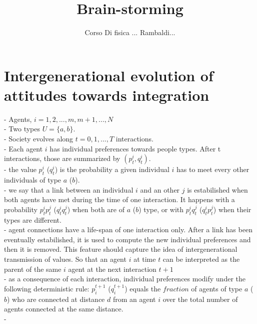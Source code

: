 \documentclass[12pt,titlepage]{article}
\title{Brain-storming}
\author{Corso Di fisica ... Rambaldi... }
\newcommand{\Andr}[1]{\textcolor{blue}{#1}}
\begin{document}


\section*{Intergenerational evolution of attitudes towards integration}


- Agents, $i = 1, 2, ..., m, m+1, ..., N$\\
- Two types $U = \{a,b\}$. \\
- Society evolves along $t=0,1,..., T$ interactions.\\
- Each agent $i$ has individual preferences towards people types. After t interactions, those are summarized by $(p_t^i, q_t^i)$. \\
- the value $p_t^i$ ($q_t^i$) is the probability a given individual $i$ has to meet every other individuals of type $a$ ($b$).\\
- we say that a link between an individual $i$ and an other $j$ is estabilished when both agents have met during the time of one interaction. It happens with a probability $p_t^i p_t^j$ ($q_t^i q_t^j$) when both are of $a$ ($b$) type, or with $p_t^i q_t^j$ ($q_t^i p_t^j$) when their types are different.\\  
- agent connections have a life-span of one interaction only. After a link has been eventually estabilished, it is used to compute the new individual preferences and then it is removed. This feature should capture the idea of intergenerational transmission of values. So that an agent $i$ at time $t$ can be interpreted as the parent of the same $i$ agent at the next interaction $t+1$\\
- as a consequence of each interaction, individual preferences modify under the following deterministic rule: $p_i^{t+1}$ ($q_i^{t+1}$) equals the $fraction$ of agents of type $a$ ($b$) who are connected at distance $d$ from an agent $i$ over the total number of agents connected at the same distance.    \\
- 
 
 
 
\end{document}
